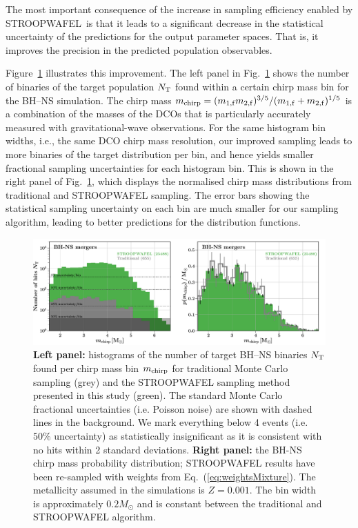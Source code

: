 \documentclass[a4paper,fleqn,usenatbib,useAMS,usedcolumn]{mnras}
\newcommand{\AISs}{\textsc{STROOPWAFEL}}
\begin{document}
The most important consequence of the increase in sampling efficiency enabled by \AISs \ is  that it leads to a significant decrease in the statistical uncertainty of the predictions for the output parameter spaces. That is, it improves the precision in the predicted population observables. 

Figure~\ref{fig:mtotHistograms} illustrates this improvement. The left panel in Fig.~\ref{fig:mtotHistograms}  shows the number of binaries of the target population  $N_{\rm{T}}$ found within a certain chirp mass  bin  for the BH--NS simulation.  The chirp mass $m_{\rm{chirp}} = (m_{\rm{1,f}} m_{\rm{2,f}})^{3/5}  /  (m_{\rm{1,f}} + m_{\rm{2,f}})^{1/5}  $  is a combination of the masses of the DCOs that is particularly accurately measured with gravitational-wave observations.  For the same histogram bin widths, i.e., the same DCO chirp mass resolution, our improved sampling leads to more binaries of the target distribution per bin, and hence yields smaller fractional sampling uncertainties for each histogram bin.  This is shown in the right panel of Fig.~\ref{fig:mtotHistograms}, which displays the normalised chirp mass distributions from traditional and \AISs{} sampling. The error bars showing the statistical sampling uncertainty on each bin are much smaller for our sampling algorithm, leading to better predictions for the distribution functions. 

%
\begin{figure}
	\includegraphics[width=1\textwidth]{MchirpHistograms.pdf}
    \caption{\textbf{Left panel:} histograms of the number of target BH--NS binaries $N_{\rm{T}}$ found per chirp mass bin $m_{\rm{chirp}}$ for traditional Monte Carlo sampling (grey) and the \AISs{} sampling method presented in this study (green). The standard Monte Carlo fractional uncertainties (i.e. Poisson noise) are shown with dashed lines in the background. We mark everything below 4 events (i.e. $50\%$ uncertainty) as statistically insignificant as it is consistent with no hits within 2 standard deviations. \textbf{Right panel:} the BH-NS chirp mass probability distribution; {\AISs{} results have been re-sampled with weights from Eq.~(\ref{eq:weightsMixture}).}  The metallicity assumed in the simulations is $Z = 0.001$. The bin width is approximately $ 0.2 M_{\odot}$  and is constant between the traditional and \AISs{} algorithm. \href{https://doi.org/10.5281/zenodo.3387651}{\color{linkcolor}\faBook}}
    \label{fig:mtotHistograms}
\end{figure}
%
\end{document}
